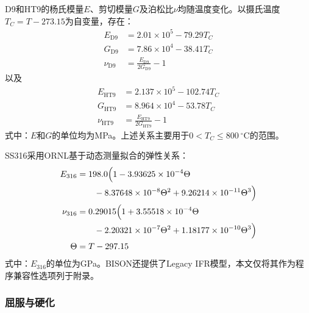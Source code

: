 D9和HT9的杨氏模量$E$、剪切模量$G$及泊松比$\nu$均随温度变化\cite{hofmanMetallicFuelsHandbook2019}。以摄氏温度$T_C=T-273.15$为自变量，存在：
\begin{subequations}\label{eq:d9_elastic_properties}
	\begin{align}
		E_{\mathrm{D9}}&=2.01\times10^5-79.29T_C
		\label{eq:d9_youngs_modulus}\\
		G_{\mathrm{D9}}&=7.86\times10^4-38.41T_C
		\label{eq:d9_shear_modulus}\\
		\nu_{\mathrm{D9}}&=\frac{E_{\mathrm{D9}}}{2G_{\mathrm{D9}}}-1
		\label{eq:d9_poisson_ratio}
	\end{align}
\end{subequations}
以及
\begin{subequations}\label{eq:ht9_elastic_properties}
	\begin{align}
		E_{\mathrm{HT9}}&=2.137\times10^5-102.74T_C
		\label{eq:ht9_youngs_modulus}\\
		G_{\mathrm{HT9}}&=8.964\times10^4-53.78T_C
		\label{eq:ht9_shear_modulus}\\
		\nu_{\mathrm{HT9}}&=\frac{E_{\mathrm{HT9}}}{2G_{\mathrm{HT9}}}-1
		\label{eq:ht9_poisson_ratio}
	\end{align}
\end{subequations}
式中：$E$和$G$的单位均为MPa。上述关系主要用于$0<T_C\leq800\ ^\circ\mathrm C$的范围。

SS316采用ORNL基于动态测量拟合的弹性关系\cite{Hammond1979ornl5442}：
\begin{subequations}\label{eq:ss316_elastic_properties}
	\begin{align}
		E_{316}
		&=198.0\Bigl(
		1-3.93625\times10^{-4}\Theta
		\notag\\
		&\qquad
		-8.37648\times10^{-8}\Theta^2
		+9.26214\times10^{-11}\Theta^3
		\Bigr)
		\label{eq:ss316_youngs_modulus}\\
		\nu_{316}
		&=0.29015\Bigl(
		1+3.55518\times10^{-4}\Theta
		\notag\\
		&\qquad
		-2.20321\times10^{-7}\Theta^2
		+1.18177\times10^{-10}\Theta^3
		\Bigr)
		\label{eq:ss316_poisson_ratio}\\
		\Theta&=T-297.15
		\label{eq:ss316_reduced_temperature}
	\end{align}
\end{subequations}
式中：$E_{316}$的单位为GPa。BISON还提供了Legacy IFR模型，本文仅将其作为程序兼容性选项列于附录。

\subsubsection{屈服与硬化}

